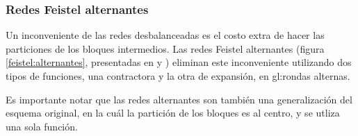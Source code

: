 %
%

\subsubsection{Redes Feistel alternantes}
\label{sec:red_feistel_alternante}

Un inconveniente de las redes desbalanceadas es el costo extra de hacer las
particiones de los bloques intermedios. Las redes Feistel alternantes
(figura \ref{feistel:alternantes}, presentadas en
\cite{DBLP:conf/fse/AndersonB96a} y \cite{DBLP:conf/fse/Lucks96}) eliminan
este inconveniente utilizando dos tipos de funciones, una contractora y la
otra de expansión, en \glspl{gl:ronda} alternas.

Es importante notar que las redes alternantes son también una generalización
del esquema original, en la cuál la partición de los bloques es al centro, y
se utliza una sola función.
